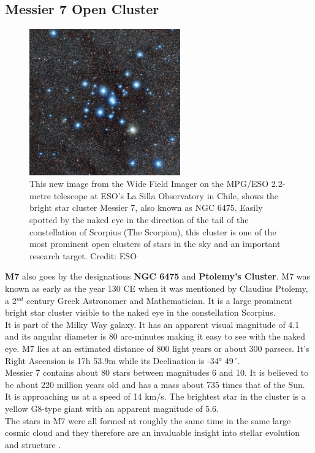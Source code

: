 \documentclass[12pt]{article}
\begin{document}
		\subsection{Messier 7 Open Cluster}
		\begin{figure}
			\includegraphics[width=0.58\textwidth]{m7_eso_0}
			\caption{This new image from the Wide Field Imager on the MPG/ESO 2.2-metre telescope at ESO’s La Silla Observatory in Chile, shows the bright star cluster Messier 7, also known as NGC 6475. Easily spotted by the naked eye in the direction of the tail of the constellation of Scorpius (The Scorpion), this cluster is one of the most prominent open clusters of stars in the sky and an important research target. \cite{eso_m7} Credit: ESO}
			\label{fig: m7}
		\end{figure}
		\textbf{M7} also goes by the designations \textbf{NGC 6475} and \textbf{Ptolemy's Cluster}. M7 was known as early as the year 130 CE when it was mentioned by Claudius Ptolemy, a 2$^{nd}$ century Greek Astronomer and Mathematician. It is a large prominent bright star cluster visible to the naked eye in the constellation Scorpius.\\
		It is part of the Milky Way galaxy. It has an apparent visual magnitude of 4.1 and its angular diameter is 80 arc-minutes making it easy to see with the naked eye. M7 lies at an estimated distance of 800 light years or about 300 parsecs. It's Right Ascension is 17h 53.9m while its Declination is -34° 49´\cite{astropixels_m7}.\\
		Messier 7 contains about 80 stars between magnitudes 6 and 10. It is believed to be about 220 million years old and has a mass about 735 times that of the Sun. It is approaching us at a speed of 14 km/s. The brightest star in the cluster is a yellow G8-type giant with an apparent magnitude of 5.6.\\
		The stars in M7 were all formed at roughly the same time in the same large cosmic cloud and they therefore are an invaluable insight into stellar evolution and structure \cite{messier007}.\\
\end{document}
